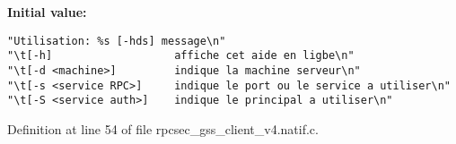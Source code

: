 {\bf Initial value:}

\footnotesize\begin{verbatim}
"Utilisation: %s [-hds] message\n"
"\t[-h]                   affiche cet aide en ligbe\n"
"\t[-d <machine>]         indique la machine serveur\n"
"\t[-s <service RPC>]     indique le port ou le service a utiliser\n" 
"\t[-S <service auth>]    indique le principal a utiliser\n"
\end{verbatim}\normalsize 


Definition at line 54 of file rpcsec\_\-gss\_\-client\_\-v4.natif.c.